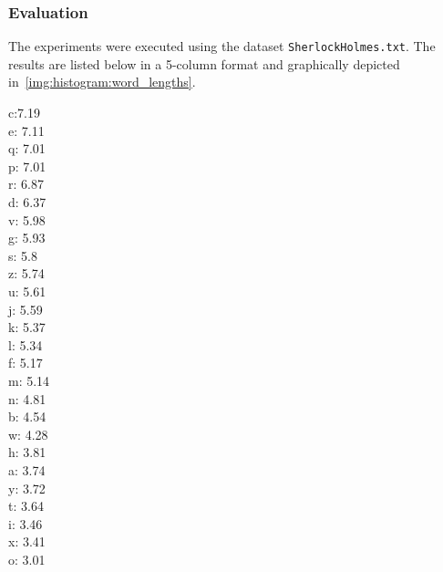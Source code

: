 \documentclass[acmlarge]{acmart}
\begin{document}
\subsubsection{Evaluation}
The experiments were executed using the dataset \texttt{SherlockHolmes.txt}. The results are listed below in a 5-column format and graphically depicted in~\autoref{img:histogram:word_lengths}.
\begin{multicols}{4}
  \noindent
  c:7.19
  \\ e: 7.11
  \\ q: 7.01
  \\ p: 7.01
  \\ r: 6.87
  \\ d: 6.37
  \\ v: 5.98
  \\ g: 5.93
  \\ s: 5.8
  \\ z: 5.74
  \\ u: 5.61
  \\ j: 5.59
  \\ k: 5.37
  \\ l: 5.34
  \\ f: 5.17
  \\ m: 5.14
  \\ n: 4.81
  \\ b: 4.54
  \\ w: 4.28
  \\ h: 3.81
  \\ a: 3.74
  \\ y: 3.72
  \\ t: 3.64
  \\ i: 3.46
  \\ x: 3.41
  \\ o: 3.01
  \label{multicol:test}
\end{multicols}





\end{document}
